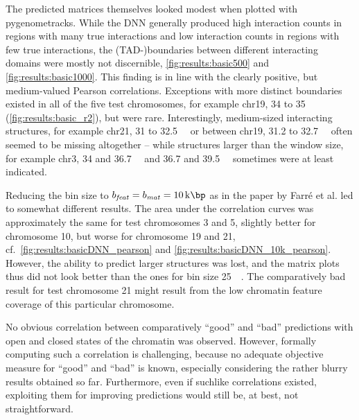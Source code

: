The predicted matrices themselves looked modest when plotted with pygenometracks. 
While the DNN generally produced high interaction counts in regions with many true interactions
and low interaction counts in regions with few true interactions, the (TAD-)boundaries between different interacting domains 
were mostly not discernible, \cref{fig:results:basic500} and \ref{fig:results:basic1000}.
This finding is in line with the clearly positive, but medium-valued Pearson correlations.
Exceptions with more distinct boundaries existed in all of the five test chromosomes,
for example chr19, 34 to \SI{35}{\kilo\bp} (\cref{fig:results:basic_r2}), but were rare. 
Interestingly, medium-sized interacting structures, for example chr21, 31 to \SI{32.5}{\kilo\bp} 
or between chr19, 31.2 to \SI{32.7}{\kilo\bp} often seemed to be missing altogether -- 
while structures larger than the window size, for example chr3, 34 and \SI{36.7}{\kilo\bp} and 36.7 and \SI{39.5}{\kilo\bp}
sometimes were at least indicated.

Reducing the bin size to $b_\mathit{feat}=b_\mathit{mat}=\SI{10}{\kilo\bp}$ as in the paper by Farr\'e et al. \cite{Farre2018a} 
led to somewhat different results.
The area under the correlation curves was approximately the same for test chromosomes 3 and 5, slightly better for chromosome 10, but worse for chromosome 19 and 21,
cf.~\cref{fig:results:basicDNN_pearson} and \ref{fig:results:basicDNN_10k_pearson}.
However, the ability to predict larger structures was lost, and the matrix plots thus did not look better than the ones for bin size \SI{25}{\kilo\bp}.
The comparatively bad result for test chromosome 21 might result from the low chromatin feature coverage of this particular chromosome.

No obvious correlation between comparatively ``good'' and ``bad'' predictions with open and closed states of the chromatin was observed.
However, formally computing such a correlation is challenging, because no adequate objective measure for ``good'' and ``bad'' is known, 
especially considering the rather blurry results obtained so far.
Furthermore, even if suchlike correlations existed, exploiting them for improving predictions would still be, at best, not straightforward.

